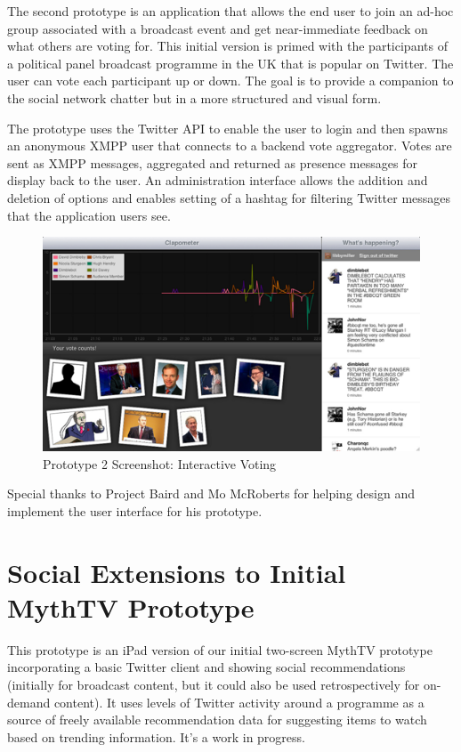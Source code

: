 \documentclass{notube}
\begin{document}
The second prototype is an application that allows the end user to join an ad-hoc group associated with a broadcast event and get near-immediate feedback on what others are voting for. This initial version is primed with the participants of a political panel broadcast programme in the UK that is popular on Twitter. The user can vote each participant up or down. The goal is to provide a companion to the social network chatter but in a more structured and visual form.


The prototype uses the Twitter API to enable the user to login and then spawns an anonymous XMPP user that connects to a backend vote aggregator. Votes are sent as XMPP messages, aggregated and returned as presence messages for display back to the user. An administration interface allows the addition and deletion of options and enables setting of a hashtag for filtering Twitter messages that the application users see.

\begin{figure}[htbp]
\begin{center}
\includegraphics[width=6in]{images/votatron.png}
\caption{Prototype 2 Screenshot: Interactive Voting} \label{fig:prototype2}
\end{center}
\end{figure}

Special thanks to Project Baird and Mo McRoberts for helping design and implement the user interface for his prototype.


\section{Social Extensions to Initial MythTV Prototype}

This prototype is an iPad version of our initial two-screen MythTV prototype incorporating a basic Twitter client and showing social recommendations (initially for broadcast content, but it could also be used retrospectively for on-demand content). It uses levels of Twitter activity around a programme as a source of freely available recommendation data for suggesting items to watch based on trending information. It's a work in progress.
\end{document}
